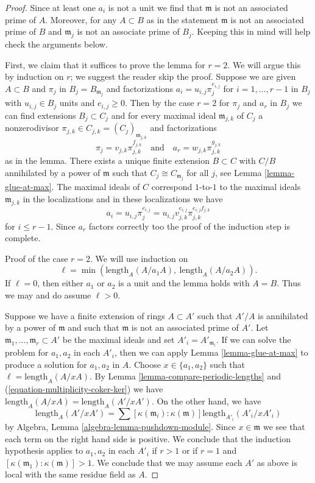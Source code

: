 \documentclass[10pt,a4paper]{amsart}
\theoremstyle{plain}
\theoremstyle{definition}
\theoremstyle{remark}
\numberwithin{equation}{subsection}
\begin{document}
\begin{proof}
Since at least one $a_i$ is not a unit we find that $\mathfrak m$
is not an associated prime of $A$. Moreover, for any $A \subset B$
as in the statement $\mathfrak m$ is not an associated prime of $B$
and $\mathfrak m_j$ is not an associate prime of $B_j$.
Keeping this in mind will help check the arguments below.

\medskip\noindent
First, we claim that it suffices to prove the lemma for $r = 2$.
We will argue this by induction on $r$; we suggest the reader
skip the proof. Suppose we are given $A \subset B$ and $\pi_j$ in
$B_j = B_{\mathfrak m_j}$ and factorizations
$a_i = u_{i, j} \pi_j^{e_{i, j}}$ for $i = 1, \ldots, r - 1$ in $B_j$
with $u_{i, j} \in B_j$ units and $e_{i, j} \geq 0$.
Then by the case $r = 2$ for $\pi_j$ and $a_r$ in $B_j$
we can find extensions $B_j \subset C_j$ and for every maximal ideal
$\mathfrak m_{j, k}$ of $C_j$ a nonzerodivisor
$\pi_{j, k} \in C_{j, k} = (C_j)_{\mathfrak m_{j, k}}$
and factorizations
$$
\pi_j = v_{j, k} \pi_{j, k}^{f_{j, k}}
\quad\text{and}\quad
a_r = w_{j, k} \pi_{j, k}^{g_{j, k}}
$$
as in the lemma. There exists a unique finite extension $B \subset C$
with $C/B$ annihilated by a power of $\mathfrak m$ such
that $C_j \cong C_{\mathfrak m_j}$ for all $j$, see
Lemma \ref{lemma-glue-at-max}.
The maximal ideals of $C$ correspond $1$-to-$1$
to the maximal ideals $\mathfrak m_{j, k}$ in the localizations
and in these localizations we have
$$
a_i = u_{i, j} \pi_j^{e_{i, j}} =
u_{i, j} v_{j, k}^{e_{i, j}} \pi_{j, k}^{e_{i, j}f_{j, k}}
$$
for $i \leq r - 1$. Since $a_r$ factors correctly too the
proof of the induction step is complete.

\medskip\noindent
Proof of the case $r = 2$. We will use induction on
$$
\ell = \min(\text{length}_A(A/a_1A),\ \text{length}_A(A/a_2A)).
$$
If $\ell = 0$, then either $a_1$ or $a_2$ is a unit and
the lemma holds with $A = B$. Thus we may and do assume $\ell > 0$.

\medskip\noindent
Suppose we have a finite extension of rings $A \subset A'$ such that
$A'/A$ is annihilated by a power of $\mathfrak m$ and such that
$\mathfrak m$ is not an associated prime of $A'$.
Let $\mathfrak m_1, \ldots, \mathfrak m_r \subset A'$
be the maximal ideals and set $A'_i = A'_{\mathfrak m_i}$.
If we can solve the problem for $a_1, a_2$ in each $A'_i$,
then we can apply Lemma \ref{lemma-glue-at-max}
to produce a solution for $a_1, a_2$ in $A$.
Choose $x \in \{a_1, a_2\}$ such that $\ell = \text{length}_A(A/xA)$.
By Lemma \ref{lemma-compare-periodic-lengths} 
and (\ref{equation-multiplicity-coker-ker})
we have $\text{length}_A(A/xA) = \text{length}_A(A'/xA')$.
On the other hand, we have
$$
\text{length}_A(A'/xA') =
\sum [\kappa(\mathfrak m_i) : \kappa(\mathfrak m)]
\text{length}_{A'_i}(A'_i/xA'_i)
$$
by Algebra, Lemma \ref{algebra-lemma-pushdown-module}.
Since $x \in \mathfrak m$ we see that each term on the right hand side
is positive. We conclude that the induction hypothesis applies
to $a_1, a_2$ in each $A'_i$ if $r > 1$ or if $r = 1$ and
$[\kappa(\mathfrak m_1) : \kappa(\mathfrak m)] > 1$.
We conclude that we may assume each $A'$ as above is local with
the same residue field as $A$.


\end{proof}
\end{document}
